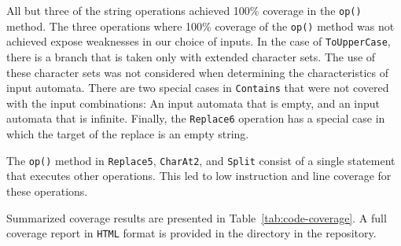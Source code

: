 \documentclass[letterpaper,sigplan]{acmart}
\begin{document}
All but three of the string operations achieved 100\% coverage in the
\lstinline{op()} method.  The three operations where 100\% coverage of the
\lstinline{op()} method was not achieved expose weaknesses in our choice of
inputs.  In the case of \lstinline{ToUpperCase}, there is a branch that is
taken only with extended character sets.  The use of these character sets was
not considered when determining the characteristics of input automata.  There
are two special cases in \lstinline{Contains} that were not covered with the
input combinations: An input automata that is empty, and an input automata that
is infinite.  Finally, the \lstinline{Replace6} operation has a special case in
which the target of the replace is an empty string.

The \lstinline{op()} method in \lstinline{Replace5}, \lstinline{CharAt2}, and
\lstinline{Split} consist of a single statement that executes other operations.
This led to low instruction and line coverage for these operations.

Summarized coverage results are presented in Table~\ref{tab:code-coverage}.  A
full coverage report in \texttt{HTML} format is provided in the 
directory in the repository.
\end{document}
